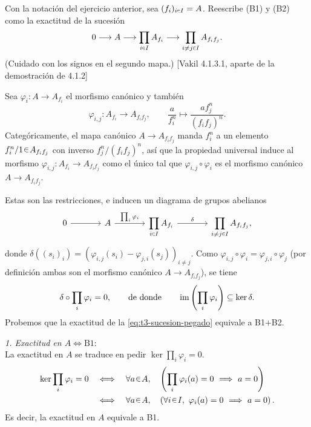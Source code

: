 \begin{ejer}\label{ejer:t3-pegado-exactitud}
Con la notación del ejercicio anterior, sea $(f_i)_{i\en I}=A$. Reescribe (B1) y (B2) como la exactitud de la sucesión
\[
0\longrightarrow A\longrightarrow\prod_{i\en I}A_{f_i}
\longrightarrow\prod_{i\ne j\en I}A_{f_i f_j}.
\]
(Cuidado con los signos en el segundo mapa.) \hfill [Vakil 4.1.3.1, aparte de la demostración de 4.1.2]
\end{ejer}
\begin{sol}
Sea $\varphi_i\colon A\to A_{f_i}$ el morfismo canónico y también
\[
\varphi_{i,j}\colon A_{f_i}\longrightarrow A_{f_i f_j},
\qquad\frac{a}{f_i^n}\longmapsto\frac{a f_j^n}{(f_i f_j)^n}.
\]
Categóricamente, el mapa canónico $A\to A_{f_i f_j}$ manda $f_i^n$ a un elemento $f_i^n/1\en A_{f_i f_j}$ con inverso $f_j^n/(f_i f_j)^n$, así que la propiedad universal induce al morfismo $\varphi_{i,j}\colon A_{f_i}\to A_{f_i f_j}$ como el único tal que $\varphi_{i,j}\circ\varphi_i$ es el morfismo canónico $A\to A_{f_i f_j}$.

Estas son las restricciones, e inducen un diagrama de grupos abelianos
\begin{equation}\label{eq:t3-sucesion-pegado}
\begin{tikzcd}[column sep=large]
0\arrow[r]&A\arrow[r,"{\prod_i\varphi_i}"]
&\displaystyle\prod_{i\en I}A_{f_i}\arrow[r,"\delta"]
&\displaystyle\prod_{i\ne j\en I}A_{f_i f_j},
\end{tikzcd}
\end{equation}
donde $\delta((s_i)_i)=(\varphi_{i,j}(s_i)-\varphi_{j,i}(s_j))_{i\ne j}$. Como $\varphi_{i,j}\circ\varphi_i=\varphi_{j,i}\circ\varphi_j$ (por definición ambas son el morfismo canónico $A\to A_{f_i f_j}$), se tiene
\[
\delta\circ\prod_i\varphi_i=0,
\qquad\text{de donde}\qquad\operatorname{im}\left(\prod_i\varphi_i\right)\subseteq\ker\delta.
\]
Probemos que la exactitud de la \cref{eq:t3-sucesion-pegado} equivale a B1+B2.

\medskip
\noindent\emph{1. Exactitud en $A\Longleftrightarrow\mathrm{B1}$}:\\
La exactitud en $A$ se traduce en pedir $\ker\prod_i\varphi_i=0$.
\[
\begin{aligned}
\ker\prod_i\varphi_i=0
&\quad\Longleftrightarrow\quad
\forall a\en A,\quad\left(\prod_i\varphi_i(a)=0\ \Longrightarrow\ a=0\right)\\
&\quad\Longleftrightarrow\quad
\forall a\en A,\quad\left(\forall i\en I,\ \varphi_i(a)=0\ \Longrightarrow\ a=0\right).
\end{aligned}
\]
Es decir, la exactitud en $A$ equivale a B1.


\end{sol}
